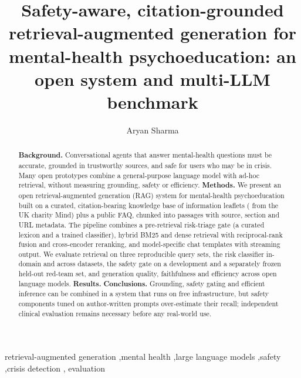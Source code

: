 \documentclass[preprint,12pt,authoryear]{elsarticle}
\begin{document}
\begin{frontmatter}

\title{Safety-aware, citation-grounded retrieval-augmented generation for mental-health psychoeducation: an open system and multi-LLM benchmark}

\author[inst1]{Aryan Sharma}

\begin{abstract}
\textbf{Background.} Conversational agents that answer mental-health questions must be accurate, grounded in trustworthy
sources, and safe for users who may be in crisis. Many open prototypes combine a general-purpose language model with
ad-hoc retrieval, without measuring grounding, safety or efficiency.
\textbf{Methods.} We present an open retrieval-augmented generation (RAG) system for mental-health psychoeducation built
on a curated, citation-bearing knowledge base of \NPDFsParsed{} information leaflets (\NMindPDFs{} from the UK charity Mind)
plus a public FAQ, chunked into \NChunks{} passages with source, section and URL metadata. The pipeline combines a
pre-retrieval risk-triage gate (a curated lexicon and a trained classifier), hybrid BM25 and dense retrieval with
reciprocal-rank fusion and cross-encoder reranking, and model-specific chat templates with streaming output. We evaluate
retrieval on three reproducible query sets, the risk classifier in-domain and across datasets, the safety gate on a
development and a separately frozen held-out red-team set, and generation quality, faithfulness and efficiency across
open language models.
\textbf{Results.} \AbstractResults
\textbf{Conclusions.} Grounding, safety gating and efficient inference can be combined in a system that runs on free
infrastructure, but safety components tuned on author-written prompts over-estimate their recall; independent
clinical evaluation remains necessary before any real-world use.
\end{abstract}

\begin{keyword}
retrieval-augmented generation \sep mental health \sep large language models \sep safety \sep crisis detection \sep
evaluation
\end{keyword}

\end{frontmatter}

\end{document}
